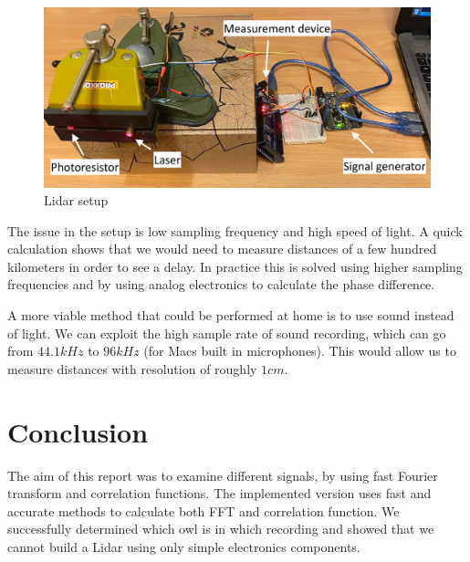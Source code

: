 \documentclass[12pt, a4paper]{article}
\begin{document}
\begin{figure}[hbtp]
  \begin{center}
  \includegraphics[width=\linewidth]{graphs/IMG_6511.jpeg}
  \end{center}
  \caption{Lidar setup}
\end{figure}

The issue in the setup is low sampling frequency and high speed of light. A quick calculation shows that we would need to measure distances of a few hundred kilometers in order to see a delay. In practice this is solved using higher sampling frequencies and by using analog electronics to calculate the phase difference.

A more viable method that could be performed at home is to use sound instead of light. We can exploit the high sample rate of sound recording, which can go from $44.1 kHz$ to $96 kHz$ (for Macs built in microphones). This would allow us to measure distances with resolution of roughly $1 cm$. 


\section{Conclusion}
The aim of this report was to examine different signals, by using fast Fourier transform and correlation functions. The implemented version uses fast and accurate methods to calculate both FFT and correlation function. We successfully determined which owl is in which recording and showed that we cannot build a Lidar using only simple electronics components.
\end{document}
